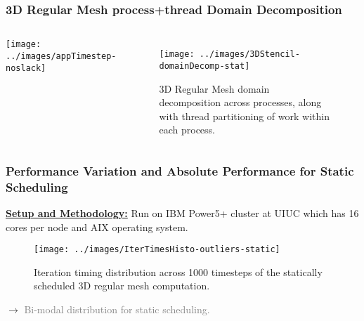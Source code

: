 \begin{frame}[label=3Dmesh]
\frametitle{3D Regular Mesh process+thread Domain Decomposition}
\begin{columns}
  \begin{center}
    \texttt{[image: ../images/appTimestep-noslack]}
 \end{center}

\begin{figure}[ht]
  \label{fig:3DStencil-domainDecomp-stat}
  \begin{center}
    \texttt{[image: ../images/3DStencil-domainDecomp-stat]}
  \end{center}
  \caption{\label{fig:3DStencil-domainDecomp-stat} {\small 3D Regular Mesh domain
  decomposition across processes, along with thread partitioning
  of work within each process.}}
\end{figure}
\end{columns}
\end{frame}


\begin{frame}[label=perfVar]
\frametitle{Performance Variation and Absolute Performance for Static Scheduling}
{\tiny \underline{\textbf{Setup and Methodology:}} Run on IBM Power5+ cluster at UIUC which has 16 cores per node and AIX operating system.}
\begin{figure}[h!]
\label{fig:stat-histo}
\begin{center}
\texttt{[image: ../images/IterTimesHisto-outliers-static]}\\
\end{center}
\caption{\label{fig:stat-histo} \small Iteration timing distribution across 1000 timesteps of the statically scheduled 3D regular mesh computation.}
\end{figure}
\begin{center}
{\small $\rightarrow$ \textcolor{gray}{Bi-modal distribution for static scheduling.} }
\end{center}
\end{frame}

